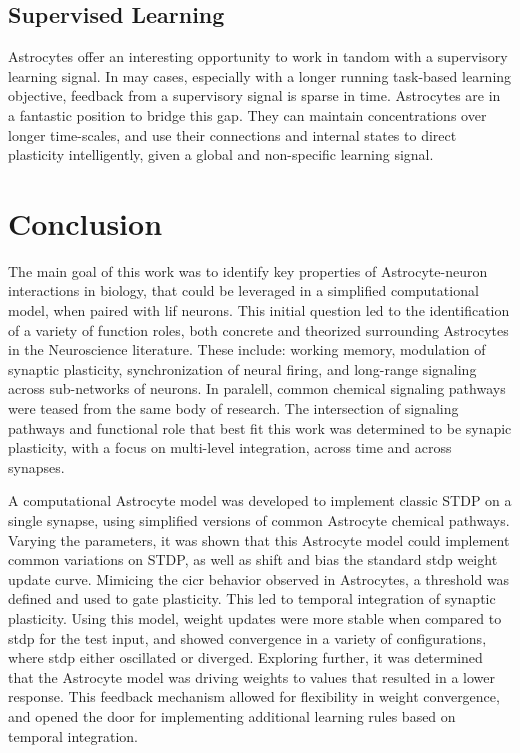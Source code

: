 \section{Supervised Learning}

Astrocytes offer an interesting opportunity to work in tandom with a supervisory
learning signal. In may cases, especially with a longer running task-based
learning objective, feedback from a supervisory signal is sparse in
time. Astrocytes are in a fantastic position to bridge this gap. They can
maintain \ca concentrations over longer time-scales, and use their connections
and internal states to direct plasticity intelligently, given a global and
non-specific learning signal.

\chapter{Conclusion} \label{chapter:conclusion}

The main goal of this work was to identify key properties of Astrocyte-neuron
interactions in biology, that could be leveraged in a simplified computational
model, when paired with \Gls{lif} neurons. This initial question led to the
identification of a variety of function roles, both concrete and theorized
surrounding Astrocytes in the Neuroscience literature. These include: working
memory, modulation of synaptic plasticity, synchronization of neural firing, and
long-range signaling across sub-networks of neurons. In paralell, common
chemical signaling pathways were teased from the same body of
research. The intersection of signaling pathways and functional role that best
fit this work was determined to be synapic plasticity, with a focus on
multi-level integration, across time and across synapses.

A computational Astrocyte model was developed to implement classic STDP
on a single synapse, using simplified versions of common Astrocyte chemical
pathways. Varying the parameters, it was shown that this Astrocyte model could
implement common variations on STDP, as well as shift and bias the standard
\Gls{stdp} weight update curve. Mimicing the \Gls{cicr} behavior observed in
Astrocytes, a threshold was defined and used to gate plasticity. This led to
temporal integration of synaptic plasticity. Using this model, weight updates
were more stable when compared to \Gls{stdp} for the test input, and showed
convergence in a variety of configurations, where \Gls{stdp} either oscillated
or diverged. Exploring further, it was determined that the Astrocyte model was
driving weights to values that resulted in a lower \ca response. This feedback
mechanism allowed for flexibility in weight convergence, and opened the door for
implementing additional learning rules based on temporal integration.

